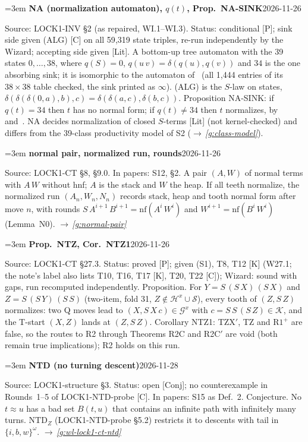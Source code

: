 \documentclass[11pt]{amsart}
\makeatletter
\newcommand{\nf}{\mathrm{nf}}
\newcommand{\Hc}{\mathcal H}
\newcommand{\Gc}{\mathcal G}
\newcommand{\Kc}{\mathcal K}
\newcounter{sense}
\newenvironment{entry}[3]{%
  \par\addvspace{\medskipamount}\noindent\phantomsection
  \def\@currentlabel{#2}\label{#1}\setcounter{sense}{0}\raggedright\emergencystretch=3em%
  \textbf{#2}\hfill{\footnotesize\textsf{#3}}\par\nopagebreak\noindent\ignorespaces}%
  {\par}
\newcommand{\src}[1]{\textsf{Source:} #1.\enskip}
\newcommand{\status}[1]{\textsf{Status:} #1.\enskip}
\newcommand{\appears}[1]{\textsf{In papers:} #1.\enskip}
\renewcommand{\see}[1]{$\rightarrow$\,\emph{\ref{#1}}}
\makeatother
\begin{document}
\begin{entry}{g:wl-na}{NA (normalization automaton), $q(t)$, Prop.~NA-SINK}{2026-11-26}
\src{LOCK1-INV \S2 (as repaired, WI.1--WI.3)}
\status{conditional [P]; sink side given (ALG) [C] on all 59{,}319 state triples, re-run
independently by the Wizard; accepting side given [Lit]}
A bottom-up tree automaton with the 39 states $0,\dots,38$, where $q(S)=0$,
$q(u\,v)=\delta(q(u),q(v))$ and $34$ is the one absorbing sink; it is isomorphic to the automaton
of~\citep[Fig.~5.11]{dots} (all 1{,}444 entries of its $38\times38$ table checked, the sink printed
as $\infty$). (ALG) is the $S$-law on states, $\delta(\delta(\delta(0,a),b),c)=\delta(\delta(a,c),
\delta(b,c))$. Proposition NA-SINK: if $q(t)=34$ then $t$ has no normal form; if $q(t)\ne34$ then $t$
normalizes, by~\citep[Thm.~9]{dots} and~\citep[Thm.~56]{waldmann-ic}. NA decides normalization of
closed $S$-terms [Lit] (not kernel-checked) and differs from the 39-class productivity model of S2
(\see{g:class-model}).
\end{entry}

\begin{entry}{g:wl-normal-pair}{normal pair, normalized run, rounds}{2026-11-26}
\src{LOCK1-CT \S8, \S9.0}
\appears{S12, \S2}
A pair $(A,W)$ of normal terms with $A\,W$ without hnf; $A$ is the stack and $W$ the heap. If all teeth
normalize, the normalized run $(A_n,W_n,N_n)$ records stack, heap and tooth normal form after move $n$,
with rounds $S\,A^{i+1}\,B^{i+1}=\nf(A^i\,W^i)$ and $W^{i+1}=\nf(B^i\,W^i)$ (Lemma~N0).
\see{g:normal-pair}
\end{entry}

\begin{entry}{g:wl-ntz}{Prop.~NTZ, Cor.~NTZ1}{2026-11-26}
\src{LOCK1-CT \S27.3}
\status{proved [P]; given (S1), T8, T12 [K] (W27.1; the note's label also lists T10, T16, T17 [K],
T20, T22 [C]); Wizard: sound with gaps, run recomputed independently}
Proposition. For $Y=S\,(S\,X)\,(S\,X)$ and $Z=S\,(S\,Y)\,(S\,S)$ (two-item, fold 31, $Z\notin\Hc^{x}\cup
\mathcal S$), every tooth of $(Z,S\,Z)$ normalizes: two Q moves lead to $(X,S\,X\,c)\in\Gc^{x}$ with
$c=S\,S\,(S\,Z)\in\Kc$, and the T-start $(X,Z)$ lands at $(Z,S\,Z)$. Corollary NTZ1: TZX$'$, TZ and
$\mathrm{R1}^{+}$ are false, so the routes to R2 through Theorems R2C and R2C$'$ are void (both remain
true implications); R2 holds on this run.
\end{entry}

\begin{entry}{g:wl-ntd}{NTD (no turning descent)}{2026-11-28}
\src{LOCK1-structure \S3}
\status{open [Conj]; no counterexample in Rounds~1--5 of LOCK1-NTD-probe [C]}
\appears{S15 as Def.~2}
Conjecture. No $t\approx u$ has a bad set $B(t,u)$ that contains an infinite path with infinitely many turns.
$\mathrm{NTD}_Z$ (LOCK1-NTD-probe \S5.2) restricts it to descents with tail in $\{i,b,w\}^\omega$.
\see{g:wl-lock1-ct-ntd}
\end{entry}
\end{document}
